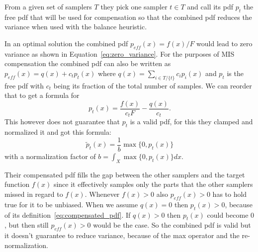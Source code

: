 From a given set of samplers $ T $ they pick one sampler $ t \in T $ and call its pdf $ p_t $ the free pdf that will be used for compensation
so that the combined pdf reduces the variance when used with the balance heuristic.

In an optimal solution the combined pdf $ p_{eff}(x) = f(x)/F $ would lead to zero variance as shown in Equation~\ref{eq:zero_variance}.
For the purposes of MIS compensation the combined pdf can also be written as $ p_{eff}(x) = q(x) + c_t p_t(x) $ where $ q(x) = \sum_{i \in T/\{t\}} c_i p_i(x) $
and $ p_t $ is the free pdf with $ c_t $ being its fraction of the total number of samples.
We can reorder that to get a formula for
\begin{equation}
    \label{eq:compensated_pdf}
    p_t(x) = \frac{f(x)}{c_t F} - \frac{q(x)}{c_t}.
\end{equation}
This however does not guarantee that $ p_t $ is a valid pdf,
for this they clamped and normalized it and got this formula:
\begin{equation}
    \label{eq:valid_compensated_pdf}
    \tilde{p}_t(x) = \frac{1}{b} \max\{0, p_t(x)\}
\end{equation}
with a normalization factor of $ b = \int_X \max\{0, p_t(x)\} dx $.

Their compensated pdf fills the gap between the other samplers and the target function $ f(x) $
since it effectively samples only the parts that the other samplers missed in regard to $ f(x) $.
Whenever $ f(x) > 0 $ also $ p_{eff}(x) > 0 $ has to hold true for it to be unbiased.
When we assume $ q(x) = 0 $ then $ p_t(x) > 0 $, because of its definition~\ref{eq:compensated_pdf}.
If $ q(x) > 0 $ then $ p_t(x) $ could become $ 0 $, but then still $ p_{eff}(x) > 0 $ would be the case.
So the combined pdf is valid but it doesn't guarantee to reduce variance, because of the max operator and the re-normalization.


